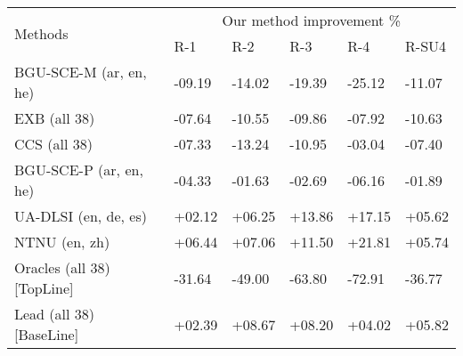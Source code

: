 \begin{tabular}{p{3.7cm}p{0.9cm}p{0.9cm}p{0.9cm}p{0.9cm}p{1cm}} 
\hline \hline
\multirow{2}{*}{Methods} & \multicolumn{5}{c}{Our method improvement \%}\\
\cline{2-6}
							& R-1	& R-2	& R-3	& R-4	& R-SU4\\
\hline
BGU-SCE-M (ar, en, he)		& -09.19	& -14.02	& -19.39	& -25.12	& -11.07\\
EXB (all 38)				& -07.64	& -10.55	& -09.86	& -07.92	& -10.63\\
CCS (all 38)				& -07.33	& -13.24	& -10.95	& -03.04	& -07.40\\
BGU-SCE-P (ar, en, he)		& -04.33	& -01.63	& -02.69	& -06.16	& -01.89\\
UA-DLSI (en, de, es)		& +02.12	& +06.25	& +13.86	& +17.15	& +05.62\\
NTNU (en, zh)				& +06.44	& +07.06	& +11.50	& +21.81	& +05.74\\
\hline
Oracles (all 38) [TopLine]	& -31.64	& -49.00	& -63.80	& -72.91	& -36.77\\
Lead (all 38) [BaseLine]	& +02.39	& +08.67	& +08.20	& +04.02	& +05.82\\
\hline \hline
\end{tabular}

